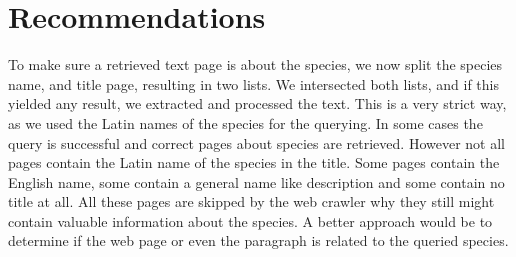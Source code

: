 \documentclass[a4paper, 12pt, oneside]{book} %
\begin{document}
\section{Recommendations}
To make sure a retrieved text page is about the species, we now split the species name, and title page, resulting in two lists. 
We intersected both lists, and if this yielded any result, we extracted and processed the text.
This is a very strict way, as we used the Latin names of the species for the querying.
In some cases the query is successful and correct pages about species are retrieved.
However not all pages contain the Latin name of the species in the title.
Some pages contain the English name, some contain a general name like description and some contain no title at all. 
All these pages are skipped by the web crawler why they still might contain valuable information about the species.
A better approach would be to determine if the web page or even the paragraph is related to the queried species.

\printbibliography
\end{document}
